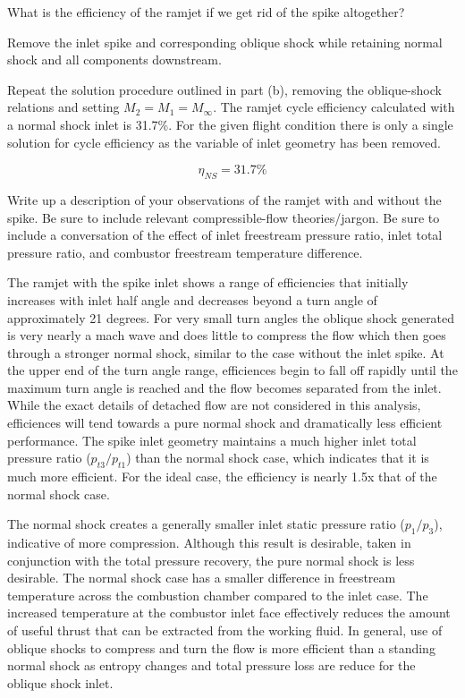 \documentclass[../main.tex]{subfiles}
\begin{document}

What is the efficiency of the ramjet if we get rid of the spike altogether?

\assumptions{}
Remove the inlet spike and corresponding oblique shock while retaining normal shock and all components downstream.

\solution{}
Repeat the solution procedure outlined in part (b), removing the oblique-shock relations and setting \(M_2 = M_1 = M_\infty\).
The ramjet cycle efficiency calculated with a normal shock inlet is 31.7\%. 
For the given flight condition there is only a single solution for cycle efficiency as the variable of inlet geometry has been removed.

\[
    \eta_{NS} = 31.7\%
\]


Write up a description of your observations of the ramjet with and without the spike.
Be sure to include relevant compressible-flow theories/jargon. 
Be sure to include a conversation of the effect of inlet freestream pressure ratio, inlet total pressure ratio, and combustor freestream temperature difference.

\discussion{}
The ramjet with the spike inlet shows a range of efficiencies that initially increases with inlet half angle and decreases beyond a turn angle of approximately 21 degrees.
For very small turn angles the oblique shock generated is very nearly a mach wave and does little to compress the flow which then goes through a stronger normal shock, similar to the case without the inlet spike.
At the upper end of the turn angle range, efficiences begin to fall off rapidly until the maximum turn angle is reached and the flow becomes separated from the inlet.
While the exact details of detached flow are not considered in this analysis, efficiences will tend towards a pure normal shock and dramatically less efficient performance.
The spike inlet geometry maintains a much higher inlet total pressure ratio (\(p_{t3}/p_{t1}\)) than the normal shock case, which indicates that it is much more efficient.
For the ideal case, the efficiency is nearly 1.5x that of the normal shock case. 

The normal shock creates a generally smaller inlet static pressure ratio (\(p_1/p_3\)), indicative of more compression.
Although this result is desirable, taken in conjunction with the total pressure recovery, the pure normal shock is less desirable.
The normal shock case has a smaller difference in freestream temperature across the combustion chamber compared to the inlet case.
The increased temperature at the combustor inlet face effectively reduces the amount of useful thrust that can be extracted from the working fluid.
In general, use of oblique shocks to compress and turn the flow is more efficient than a standing normal shock as entropy changes and total pressure loss are reduce for the oblique shock inlet.
\end{document}
